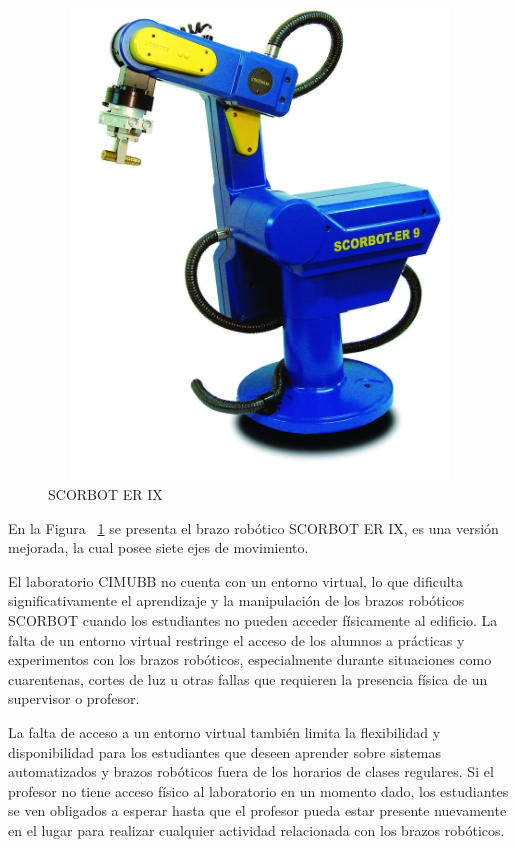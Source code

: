 \begin{figure}[h]
\centering
\includegraphics[width=13cm, height=12.5cm]{figures/scor9.jpg}
\caption{SCORBOT ER IX}
\label{fig:scor9}
\end{figure}

En la Figura ~\ref{fig:scor9} se presenta el brazo robótico SCORBOT ER IX, es una versión mejorada, la cual posee siete ejes de movimiento.

El laboratorio CIMUBB no cuenta con un entorno virtual, lo que dificulta significativamente el aprendizaje y la manipulación de los brazos robóticos SCORBOT cuando los estudiantes no pueden acceder físicamente al edificio. La falta de un entorno virtual restringe el acceso de los alumnos a prácticas y experimentos con los brazos robóticos, especialmente durante situaciones como cuarentenas, cortes de luz u otras fallas que requieren la presencia física de un supervisor o profesor.

La falta de acceso a un entorno virtual también limita la flexibilidad y disponibilidad para los estudiantes que deseen aprender sobre sistemas automatizados y brazos robóticos fuera de los horarios de clases regulares. Si el profesor no tiene acceso físico al laboratorio en un momento dado, los estudiantes se ven obligados a esperar hasta que el profesor pueda estar presente nuevamente en el lugar para realizar cualquier actividad relacionada con los brazos robóticos.